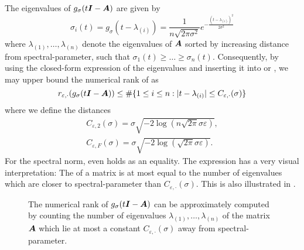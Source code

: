 The eigenvalues of $g_{\sigma}(t\boldsymbol{I} - \boldsymbol{A})$ are given by
\begin{equation}
    \sigma_i(t) = g_{\sigma}(t - \lambda_{(i)}) = \frac{1}{n \sqrt{2 \pi \sigma^2}} e^{-\frac{(t - \lambda_{(i)})^2}{2 \sigma^2}}
    \label{equ:3-nystrom-kernel-function-eigenvalues}
\end{equation}
where $\lambda_{(1)}, \dots, \lambda_{(n)}$ denote the
eigenvalues of $\boldsymbol{A}$ sorted by increasing
distance from \gls{spectral-parameter}, such that $\sigma_1(t) \geq \dots \geq \sigma_n(t)$.
Consequently, by using the closed-form expression of the eigenvalues 
and inserting it into  or
,
we may upper bound the numerical rank of  as
\begin{equation}
    r_{\varepsilon, \cdot}(g_{\sigma}(t\boldsymbol{I} - \boldsymbol{A})) \leq \#\{1\leq i\leq n: |t - \lambda_{(i)}| \leq C_{\varepsilon, \cdot}(\sigma)\}
    \label{equ:3-nystrom-kernel-numerical-rank}
\end{equation}
where we define the distances
\begin{align}
    C_{\varepsilon, 2}(\sigma) = \sigma \sqrt{-2 \log(n \sqrt{2 \pi} \sigma \varepsilon)}, \label{equ:3-nystrom-kernel-numerical-rank-spectral-constant} \\
    C_{\varepsilon, F}(\sigma) = \sigma \sqrt{-2 \log(\sqrt{2 \pi} \sigma \varepsilon)}. \label{equ:3-nystrom-kernel-numerical-rank-frobenius-constant} 
\end{align}
For the spectral norm,  even holds
as an equality.
The expression  has a very
visual interpretation: The  of a matrix is at most
equal to the number of eigenvalues which are closer to \gls{spectral-parameter}
than $C_{\varepsilon, \cdot}(\sigma)$.
This is also illustrated in .\\
\begin{figure}[ht]
    \centering
    
    \caption{The numerical rank of $g_{\sigma}(t\boldsymbol{I} - \boldsymbol{A})$ can be
        approximately computed by counting the number of eigenvalues
        $\lambda_{(1)}, \dots, \lambda_{(n)}$ of the matrix $\boldsymbol{A}$ which lie at most
        a constant $C_{\varepsilon, \cdot}(\sigma)$ away from \gls{spectral-parameter}.}
    \label{fig:3-nystrom-numerical-rank-constant}
\end{figure}

